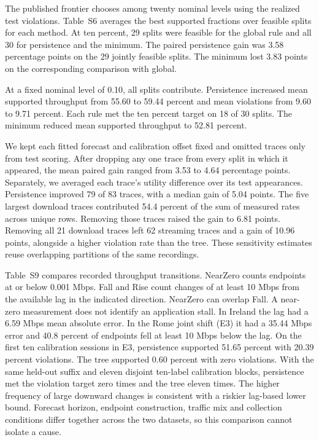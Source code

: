 \documentclass[journal,onecolumn,10pt]{IEEEtran}
\begin{document}
The published frontier chooses among twenty nominal levels using the realized test violations. Table~S6 averages the best supported fractions over feasible splits for each method. At ten percent, 29 splits were feasible for the global rule and all 30 for persistence and the minimum. The paired persistence gain was 3.58 percentage points on the 29 jointly feasible splits. The minimum lost 3.83 points on the corresponding comparison with global.


At a fixed nominal level of 0.10, all splits contribute. Persistence increased mean supported throughput from 55.60 to 59.44 percent and mean violations from 9.60 to 9.71 percent. Each rule met the ten percent target on 18 of 30 splits. The minimum reduced mean supported throughput to 52.81 percent.


We kept each fitted forecast and calibration offset fixed and omitted traces only from test scoring. After dropping any one trace from every split in which it appeared, the mean paired gain ranged from 3.53 to 4.64 percentage points. Separately, we averaged each trace's utility difference over its test appearances. Persistence improved 79 of 83 traces, with a median gain of 5.04 points. The five largest download traces contributed 54.4 percent of the sum of measured rates across unique rows. Removing those traces raised the gain to 6.81 points. Removing all 21 download traces left 62 streaming traces and a gain of 10.96 points, alongside a higher violation rate than the tree. These sensitivity estimates reuse overlapping partitions of the same recordings.


Table~S9 compares recorded throughput transitions. NearZero counts endpoints at or below 0.001 Mbps. Fall and Rise count changes of at least 10 Mbps from the available lag in the indicated direction. NearZero can overlap Fall. A near-zero measurement does not identify an application stall. In Ireland the lag had a 6.59 Mbps mean absolute error. In the Rome joint shift (E3) it had a 35.44 Mbps error and 40.8 percent of endpoints fell at least 10 Mbps below the lag. On the first ten calibration sessions in E3, persistence supported 51.65 percent with 20.39 percent violations. The tree supported 0.60 percent with zero violations. With the same held-out suffix and eleven disjoint ten-label calibration blocks, persistence met the violation target zero times and the tree eleven times. The higher frequency of large downward changes is consistent with a riskier lag-based lower bound. Forecast horizon, endpoint construction, traffic mix and collection conditions differ together across the two datasets, so this comparison cannot isolate a cause.

\end{document}

